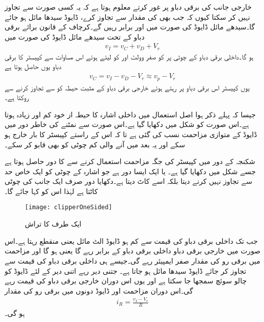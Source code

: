 خارجی جانب کی برقی دباو  پر غور کرتے معلوم ہوتا ہے کہ یہ کسی صورت  سے تجاوز نہیں کر سکتا کیوں کہ جب بھی  کی مقدار  سے تجاوز کرے،  ڈایوڈ سیدھا مائل ہو جائے گا۔سیدھے مائل ڈایوڈ کی صورت میں  اور  برابر رہیں گے۔کرچاف کے قانون برائے برقی دباو کے تحت سیدھے مائل ڈایوڈ کی صورت میں
\begin{align*}
v_I=v_C+v_D+V_r
\end{align*}
ہو گا۔داخلی برقی دباو کے چوٹی پر  کو صفر وولٹ اور  کو  لیتے ہوئے اس مساوات سے کپیسٹر کا برقی دباو یوں حاصل ہوتا ہے
\begin{align*}
v_C= v_I-v_D-V_r \approx v_p - V_r
\end{align*}
یوں کپیسٹر اس برقی دباو پر رہتے ہوئے خارجی برقی دباو کے مثبت حیطہ کو  سے تجاوز کرنے سے روکتا ہے۔

جیسا کہ پہلے ذکر ہوا اصل استعمال میں داخلی اشارہ کا حیطہ از خود کم اور زیادہ ہوتا ہے۔اس صورت کو شکل میں دکھایا گیا ہے۔اس صورت سے نمٹنے کی خاطر دور میں ڈایوڈ کے متوازی مزاحمت  نسب کی گئی ہے تا کہ اس کے راستے کپیسٹر کا بار خارج ہو سکے اور یہ بعد میں آنے والی کم چوٹی کو بھی قابو کر سکے۔



شکنجہ کے دور میں کپیسٹر کی جگہ مزاحمت استعمال کرنے سے   کا دور حاصل ہوتا ہے جسے شکل  میں دکھایا گیا ہے۔ یا  ایک ایسا دور ہے جو اشارہ کے چوٹی کو ایک خاص حد سے تجاوز نہیں کرنے دیتا بلکہ اسے کاٹ دیتا ہے۔دکھایا دور صرف ایک جانب کی چوٹی کاٹتا ہے لہٰذا اس کو  کہا جائے گا۔
 \begin{figure}
\centering
\texttt{[image: clipperOneSided]}
\caption{ایک طرف کا تراش}
\label{شکل_ایک_طرف_کا_تراش}
\end{figure}
جب تک داخلی برقی دباو کی قیمت  سے کم ہو ڈایوڈ الٹ مائل یعنی منقطع رہتا ہے۔اس صورت میں خارجی برقی دباو داخلی برقی دباو کے برابر رہے گا یعنی ہو گا اور مزاحمت   میں برقی رو کی مقدار صفر ایمپیئر رہے گی۔جیسے ہی داخلی برقی دباو  کی قیمت  سے تجاوز کر جائے ڈایوڈ سیدھا مائل ہو جاتا ہے۔ جتنی دیر   رہے اتنی دیر کے لئے  ڈایوڈ کو چالو سوئچ سمجھا جا سکتا ہے اور یوں اس دوران خارجی برقی دباو کی قیمت  رہے گی۔اس دوران مزاحمت اور ڈایوڈ دونوں میں برقی رو کی مقدار
\begin{align*}
i_R=\frac{v_I-V_r}{R}
\end{align*}
ہو گی۔

